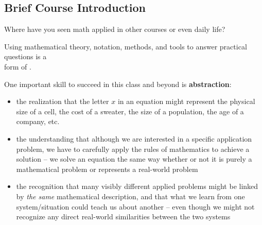 \documentclass[12pt]{article}
\author{\large Name: \underline{\hspace{4.5in}}}
\begin{document}

\subsection*{Brief Course Introduction}

Where have you seen math applied in other courses or even daily life?
\vspace{2.2in}

\noindent Using mathematical theory, notation, methods, and tools to answer practical questions is a \\

\vspace{-.12in}
\noindent form of \underline{\hspace{3.3in}}.

\vspace{.5in}
%
%
%

\noindent One important skill to succeed in this class and beyond is {\bf abstraction}:
\begin{itemize}
\item the realization that the letter $x$ in an equation might represent the physical size of a cell, the cost of a sweater, the size of a population, the age of a company, etc.\\
\item the understanding that although we are interested in a specific application problem, we have to carefully apply the rules of mathematics to achieve a solution -- we solve an equation the same way whether or not it is purely a mathematical problem or represents a real-world problem\\
\item the recognition that many visibly different applied problems might be linked by {\it the same} mathematical description, and that what we learn from one system/situation could teach us about another -- even though we might not recognize any direct real-world similarities between the two systems
\end{itemize}
\end{document}
